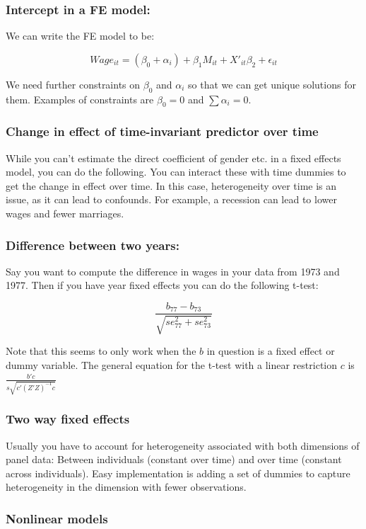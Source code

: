 \documentclass[12 pt, leqno]{article}
\begin{document}
\subsubsection{Intercept in a FE model:} We can write the FE model to be:

$$Wage_{it} = (\beta_0 + \alpha_i) + \beta_1 M_{it} + X'_{it} \beta_2 + \epsilon_{it} $$

We need further constraints on $\beta_0$ and $\alpha_i$ so that we can get unique solutions for them. Examples of constraints are $\beta_0 = 0$ and $\sum{\alpha_i} = 0$. 

\subsubsection{Change in effect of time-invariant predictor over time} While you can't estimate the direct coefficient of gender etc. in a fixed effects model, you can do the following. You can interact these with time dummies to get the change in effect over time. In this case, heterogeneity over time is an issue, as it can lead to confounds. For example, a recession can lead to lower wages and fewer marriages.

\subsubsection{Difference between two years:} Say you want to compute the difference in wages in your data from 1973 and 1977. Then if you have year fixed effects you can do the following t-test:

$$ \frac{b_{77} - b_{73}}{\sqrt{se_{77}^2 + se_{73}^2}} $$

Note that this seems to only work when the $b$ in question is a fixed effect or dummy variable. The general equation for the t-test with a linear restriction $c$ is $\frac{b' c}{s \sqrt{c' (Z'Z)^{-1} c}}$

\subsubsection{Two way fixed effects}

Usually you have to account for heterogeneity associated with both dimensions of panel data: Between individuals (constant over time) and over time (constant across individuals). Easy implementation is adding a set of dummies to capture heterogeneity in the dimension with fewer observations.

\subsubsection{Nonlinear models}
\end{document}
